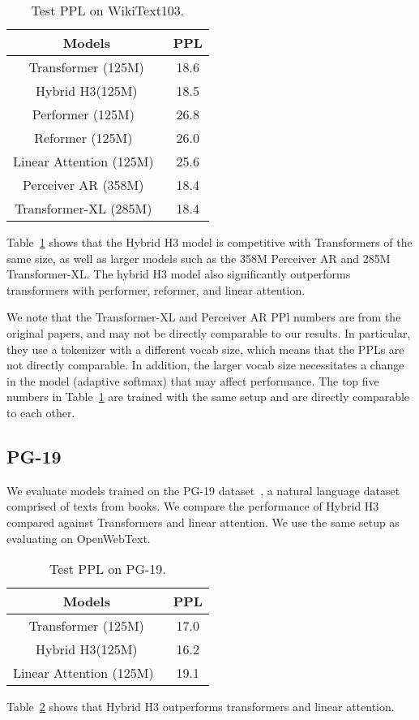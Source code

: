 \documentclass{article}
\newcommand{\hthree}{\textsc{H3}\xspace}
\begin{document}
\begin{table}[h]
\caption{\label{table:wikitext103} Test PPL on WikiText103.}
\centering
\small
\begin{tabular}{|c|c|}
\hline
Models &  PPL \\
\hline
Transformer (125M) & 18.6  \\
Hybrid \hthree (125M) & 18.5 \\
Performer (125M)~\citep{choromanski2020rethinking} & 26.8 \\
Reformer (125M)~\citep{kitaev2020reformer} & 26.0 \\
Linear Attention (125M)~\citep{katharopoulos2020transformers} & 25.6 \\ \hline
Perceiver AR (358M)~\citep{hawthorne2022general} & 18.4 \\
Transformer-XL (285M)~\citep{dai2019transformer} & 18.4 \\ \hline
\end{tabular}
\end{table} 
Table~\ref{table:wikitext103} shows that the Hybrid \hthree model is competitive with Transformers of the same size, as well as larger models such as the 358M Perceiver AR and 285M Transformer-XL.
The hybrid \hthree model also significantly outperforms transformers with performer, reformer, and linear attention.

We note that the Transformer-XL and Perceiver AR PPl numbers are from the original papers, and may not be directly comparable to our results.
In particular, they use a tokenizer with a different vocab size, which means that the PPLs are not directly comparable.
In addition, the larger vocab size necessitates a change in the model (adaptive softmax) that may affect performance.
The top five numbers in Table~\ref{table:wikitext103} are trained with the same setup and are directly comparable to each other.

\subsection{PG-19}
We evaluate models trained on the PG-19 dataset~\citep{rae2019compressive}, a natural language dataset comprised of texts from books.
We compare the performance of Hybrid \hthree compared against Transformers and linear attention.
We use the same setup as evaluating on OpenWebText.

\begin{table}[h]
\caption{\label{table:pg19} Test PPL on PG-19.}
\centering
\small
\begin{tabular}{|c|c|}
\hline
Models &  PPL \\
\hline
Transformer (125M) & 17.0  \\
Hybrid \hthree (125M) & 16.2 \\
Linear Attention (125M)~\citep{katharopoulos2020transformers} & 19.1 \\ \hline
\end{tabular}
\end{table} 
Table~\ref{table:pg19} shows that Hybrid \hthree outperforms transformers and linear attention.
\end{document}
